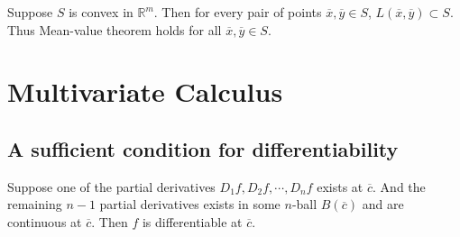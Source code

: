 \begin{remark}
	Suppose $S$ is convex in $\mathbb{R}^m$. Then for every pair of points $\overline{x},\overline{y} \in S$, $L(\overline{x},\overline{y}) \subset S$. Thus Mean-value theorem holds for all $\overline{x},\overline{y} \in S$.
\end{remark}

\section{Multivariate Calculus}
\subsection{A sufficient condition for differentiability}
\begin{theorem}
	Suppose one of the partial derivatives $D_1f,D_2f,\cdots,D_nf$ exists at $\overline{c}$. And the remaining $n-1$ partial derivatives exists in some $n$-ball $B(\overline{c})$ and are continuous at $\overline{c}$. Then $f$ is differentiable at $\overline{c}$.
\end{theorem}
